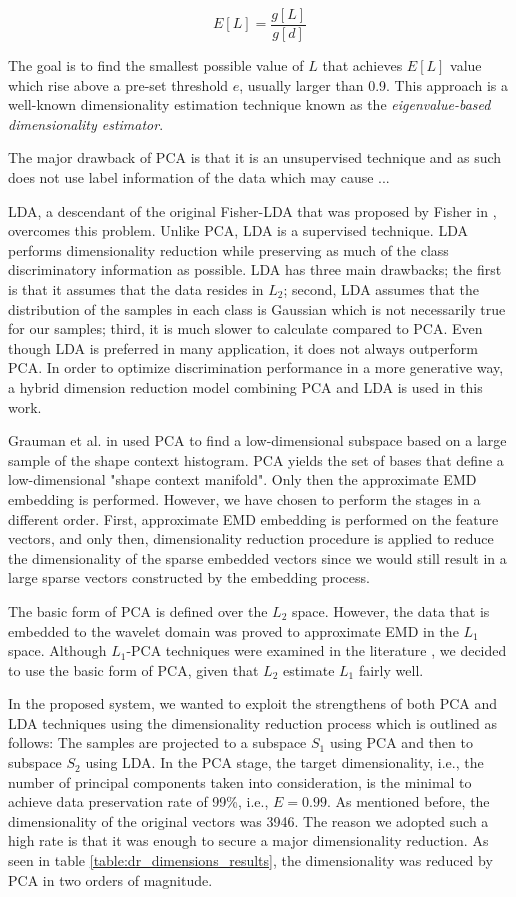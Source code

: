 \documentclass[10pt, conference, compsocconf]{IEEEtran}
\theoremstyle{definition}
\begin{document}
\begin{equation}
E[L] = \frac{g[L]}{g[d]}
\label{eq:dr_energy} 
\end{equation} 

The goal is to find the smallest possible value of $L$ that achieves $E[L]$ value which rise above a pre-set threshold $e$, usually larger than 0.9. 
This approach is a well-known dimensionality estimation technique known as the \emph{eigenvalue-based dimensionality estimator}. 

The major drawback of PCA is that it is an unsupervised technique and as such does not use label information of the data
which may cause ...

LDA, a descendant of the original Fisher-LDA that was proposed by Fisher in \cite{fisher1936use}, overcomes this problem. Unlike PCA, LDA is a supervised technique. 
LDA performs dimensionality reduction while preserving as much of the class discriminatory information as possible. 
LDA has three main drawbacks; the first is that it assumes that the data resides in $L_2$; second, LDA assumes that the distribution of the samples in each class is Gaussian which is not necessarily true for our samples; third, it is much slower to calculate compared to PCA.
Even though LDA is preferred in many application, it does not always outperform PCA. 
In order to optimize discrimination performance in a more generative way, a hybrid dimension reduction model combining PCA and LDA is used in this work.

Grauman et al. in \cite{grauman2004fast} used PCA to find a low-dimensional subspace based on a large sample of the shape context histogram. 
PCA yields the set of bases that define a low-dimensional "shape context manifold". 
Only then the approximate EMD embedding is performed. 
However, we have chosen to perform the stages in a different order. 
First, approximate EMD embedding is performed on the feature vectors, and only then, dimensionality reduction procedure is applied to reduce the dimensionality of the sparse embedded vectors since we would still result in a large sparse vectors constructed by the embedding process.

The basic form of PCA is defined over the $L_2$ space. 
However, the data that is embedded to the wavelet domain was proved to approximate EMD in the $L_1$ space. 
Although $L_1$-PCA techniques were examined in the literature \cite{kwak2008principal}, we decided to use the basic form of PCA, given that $L_2$ estimate $L_1$ fairly well.

In the proposed system, we wanted to exploit the strengthens of both PCA and LDA techniques using the dimensionality reduction process which is outlined as follows: The samples are projected to a subspace $S_1$ using PCA and then to subspace $S_2$ using LDA. In the PCA stage, the target dimensionality, i.e., the number of principal components taken into consideration, is the minimal to achieve data preservation rate of 99\%, i.e., $E=0.99$. As mentioned before, the dimensionality of the original vectors was 3946. The reason we adopted such a high rate is that it was enough to secure a major dimensionality reduction. As seen in table \ref{table:dr_dimensions_results}, the dimensionality was reduced by PCA in two orders of magnitude.
\end{document}
